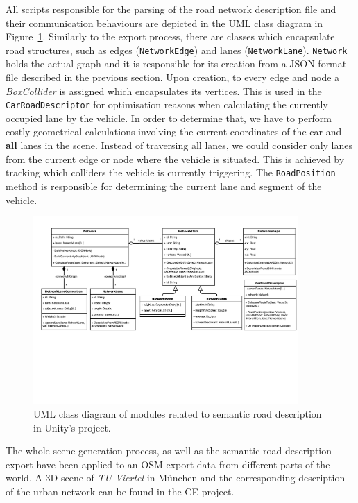 All scripts responsible for the parsing of the road network description file and their communication behaviours are depicted in the UML class diagram in Figure~\ref{fig:unity-uml-1}. Similarly to the export process, there are classes which encapsulate road structures, such as edges (\texttt{NetworkEdge}) and lanes (\texttt{NetworkLane}). \texttt{Network} holds the actual graph and it is responsible for its creation from a JSON format file described in the previous section. Upon creation, to every edge and node a \emph{BoxCollider} is assigned which encapsulates its vertices. This is used in the \texttt{CarRoadDescriptor} for optimisation reasons when calculating the currently occupied lane by the vehicle. In order to determine that, we have to perform costly geometrical calculations involving the current coordinates of the car and \textbf{all} lanes in the scene. Instead of traversing all lanes, we could consider only lanes from the current edge or node where the vehicle is situated. This is achieved by tracking which colliders the vehicle is currently triggering. The \texttt{RoadPosition} method is responsible for determining the current lane and segment of the vehicle.

\begin{figure}[htb]
	\centering
	\includegraphics[width=0.9\textwidth]{figures/unity-uml}
	\caption{UML class diagram of modules related to semantic road description in Unity's project.}
	\label{fig:unity-uml-1}
\end{figure}

The whole scene generation process, as well as the semantic road description export have been applied to an OSM export data from different parts of the world. A 3D scene of \emph{TU Viertel} in M\"unchen and the corresponding description of the urban network can be found in the CE project. 



